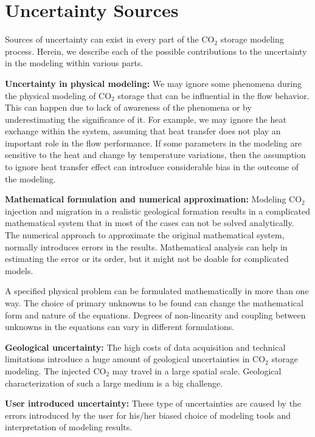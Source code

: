 \section{Uncertainty Sources}
\label{uncertaintySources}

Sources of uncertainty can exist in every part of the $\mbox{CO}_2$ storage modeling
process. Herein, we describe each of the possible contributions to the
uncertainty in the modeling within various parts.

\textbf{Uncertainty in physical modeling:} We may ignore some phenomena during
the physical modeling of $\mbox{CO}_2$ storage that can be influential in the
flow behavior. This can happen due to lack of awareness of the phenomena or by
underestimating the significance of it. For
example, we may ignore the heat exchange within the system, assuming that heat transfer does not play an important role in the flow performance. If some parameters in the modeling are sensitive to the heat and change by temperature variations, then the assumption to ignore heat transfer effect can introduce considerable bias in the outcome of the modeling.

\textbf{Mathematical formulation and numerical approximation:} Modeling $\mbox{CO}_2$ injection and migration in a realistic geological
formation results in a complicated mathematical system that in most of the cases
can not be solved analytically. The numerical approach to approximate the
original mathematical system, normally introduces errors in the results.
Mathematical analysis can help in estimating the error or its order, but it
might not be doable for complicated models.

A specified
physical problem can be formulated mathematically in more than one way. The
choice of primary unknowns to be found can change the mathematical form and
nature of the equations. Degrees of non-linearity and coupling between unknowns
in the equations can vary in different formulations. 



\textbf{Geological uncertainty:} The high costs of data acquisition and
technical
limitations introduce a huge amount of geological uncertainties in $\mbox{CO}_2$
storage modeling. The injected $\mbox{CO}_2$ may travel in a large spatial scale. Geological characterization of such a large medium is a big challenge.

\textbf{User introduced uncertainty:} These type of uncertainties are caused by
the errors introduced by the user for his/her biased choice of modeling tools and
interpretation of modeling results. 

